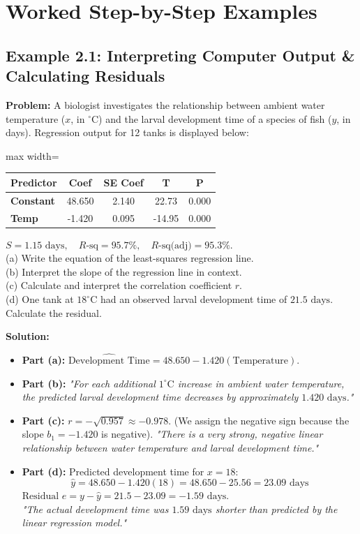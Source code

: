 \section{Worked Step-by-Step Examples}

\subsection*{Example 2.1: Interpreting Computer Output \& Calculating Residuals}
\textbf{Problem:} A biologist investigates the relationship between ambient water temperature ($x$, in $^\circ\text{C}$) and the larval development time of a species of fish ($y$, in days). Regression output for 12 tanks is displayed below:
\begin{center}
\begin{adjustbox}{max width=\linewidth}
\begin{tabular}{lcccc}
\toprule
\textbf{Predictor} & \textbf{Coef} & \textbf{SE Coef} & \textbf{T} & \textbf{P} \\
\midrule
\textbf{Constant} & 48.650 & 2.140 & 22.73 & 0.000 \\
\textbf{Temp} & -1.420 & 0.095 & -14.95 & 0.000 \\
\bottomrule
\end{tabular}
\end{adjustbox}
\end{center}
$S = 1.15\text{ days}, \quad R\text{-sq} = 95.7\%, \quad R\text{-sq(adj)} = 95.3\%$.\\
(a) Write the equation of the least-squares regression line.\\
(b) Interpret the slope of the regression line in context.\\
(c) Calculate and interpret the correlation coefficient $r$.\\
(d) One tank at $18^\circ\text{C}$ had an observed larval development time of $21.5\text{ days}$. Calculate the residual.

\textbf{Solution:}
\begin{itemize}[leftmargin=1.2em]
  \item \textbf{Part (a):} $\widehat{\text{Development Time}} = 48.650 - 1.420(\text{Temperature})$.
  \item \textbf{Part (b):} \textit{"For each additional $1^\circ\text{C}$ increase in ambient water temperature, the predicted larval development time decreases by approximately $1.420\text{ days}$."}
  \item \textbf{Part (c):} $r = -\sqrt{0.957} \approx -0.978$. (We assign the negative sign because the slope $b_1 = -1.420$ is negative).
  \textit{"There is a very strong, negative linear relationship between water temperature and larval development time."}
  \item \textbf{Part (d):} Predicted development time for $x = 18$:
  \[ \hat{y} = 48.650 - 1.420(18) = 48.650 - 25.56 = 23.09\text{ days} \]
  $\text{Residual } e = y - \hat{y} = 21.5 - 23.09 = -1.59\text{ days}$.\\
  \textit{"The actual development time was $1.59\text{ days}$ shorter than predicted by the linear regression model."}
\end{itemize}


